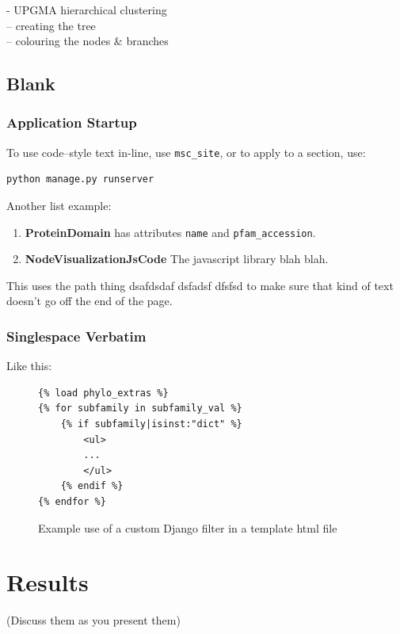 \documentclass[12pt,a4paper]{article}
\begin{document}
- UPGMA hierarchical clustering\\
-- creating the tree\\
-- colouring the nodes \& branches\\


\subsection{Blank}

\subsubsection{Application Startup}
\label{sec:startup}
To use code--style text in-line, use \texttt{msc\_site}, or to apply to a section, use:

\begin{verbatim}
python manage.py runserver
\end{verbatim}

Another list example:

\begin{enumerate}
\item {\bf ProteinDomain} has attributes \texttt{name} and \texttt{pfam\_accession}.
\item {\bf NodeVisualizationJsCode} The javascript library blah blah.
\end{enumerate}


This uses the path thing dsafdsdaf dsfadsf dfsfsd  to make sure that kind of text doesn't go off the end of the page. 

\subsubsection{Singlespace Verbatim}
\label{sec:template_tags}
Like this:
\singlespace
\begin{figure}[H]
\begin{verbatim}
{% load phylo_extras %}
{% for subfamily in subfamily_val %}
    {% if subfamily|isinst:"dict" %}
        <ul>
        ...
        </ul>
    {% endif %}
{% endfor %}
\end{verbatim}
\caption{Example use of a custom Django filter in a template html file}
\label{fig:custom_filter_code}
\end{figure}
\doublespace

\section{Results}
\label{sec:results}
(Discuss them as you present them)\\
\end{document}
